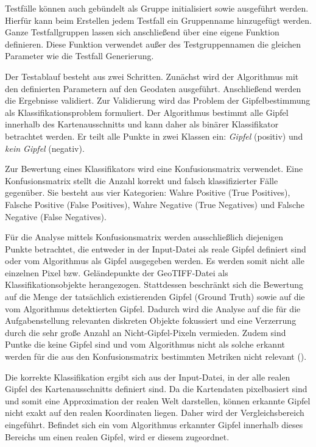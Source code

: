 Testfälle können auch gebündelt als Gruppe initialisiert sowie ausgeführt werden. Hierfür kann beim Erstellen jedem Testfall ein Gruppenname hinzugefügt werden. Ganze Testfallgruppen lassen sich anschließend über eine eigene Funktion definieren. Diese Funktion verwendet außer des Testgruppennamen die gleichen Parameter wie die Testfall Generierung. 

Der Testablauf besteht aus zwei Schritten. Zunächst wird der Algorithmus mit den definierten Parametern auf den Geodaten ausgeführt. Anschließend werden die Ergebnisse validiert. Zur Validierung wird das Problem der Gipfelbestimmung als Klassifikationsproblem formuliert. Der Algorithmus bestimmt alle Gipfel innerhalb des Kartenausschnitts und kann daher als binärer Klassifikator betrachtet werden. Er teilt alle Punkte in zwei Klassen ein: \textit{Gipfel} (positiv) und \textit{kein Gipfel} (negativ).

Zur Bewertung eines Klassifikators wird eine Konfusionsmatrix verwendet. Eine Konfusionsmatrix stellt die Anzahl korrekt und falsch klassifizierter Fälle gegenüber. Sie besteht aus vier Kategorien: Wahre Positive (True Positives), Falsche Positive (False Positives), Wahre Negative (True Negatives) und Falsche Negative (False Negatives).

Für die Analyse mittels Konfusionsmatrix werden ausschließlich diejenigen Punkte betrachtet, die entweder in der Input-Datei als reale Gipfel definiert sind oder vom Algorithmus als Gipfel ausgegeben werden. Es werden somit nicht alle einzelnen Pixel bzw. Geländepunkte der GeoTIFF-Datei als Klassifikationsobjekte herangezogen. Stattdessen beschränkt sich die Bewertung auf die Menge der tatsächlich existierenden Gipfel (Ground Truth) sowie auf die vom Algorithmus detektierten Gipfel. Dadurch wird die Analyse auf die für die Aufgabenstellung relevanten diskreten Objekte fokussiert und eine Verzerrung durch die sehr große Anzahl an Nicht-Gipfel-Pixeln vermieden. Zudem sind Puntke die keine Gipfel sind und vom Algorithmus nicht als solche erkannt werden für die aus den Konfusionsmatrix bestimmten Metriken nicht relevant ().

Die korrekte Klassifikation ergibt sich aus der Input-Datei, in der alle realen Gipfel des Kartenausschnitts definiert sind. Da die Kartendaten pixelbasiert sind und somit eine Approximation der realen Welt darstellen, können erkannte Gipfel nicht exakt auf den realen Koordinaten liegen. Daher wird der Vergleichsbereich eingeführt. Befindet sich ein vom Algorithmus erkannter Gipfel innerhalb dieses Bereichs um einen realen Gipfel, wird er diesem zugeordnet. 

